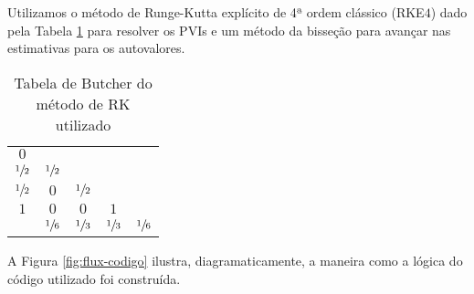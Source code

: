 \documentclass[twocolumn,showpacs,%
  nofootinbib,aps,superscriptaddress,%
  eqsecnum,prd,notitlepage,showkeys,10pt]{revtex4-1}
\begin{document}
Utilizamos o método de Runge-Kutta explícito de 4ª ordem clássico (RKE$4$) dado pela
Tabela \ref{tab:RKE4} para resolver os PVIs e um método da bisseção para
avançar nas estimativas para os autovalores.
%
\begin{table}[H]
    \centering
    \caption{Tabela de Butcher do método de RK utilizado}
    \begin{tabular}{c|cccc}
        $0$ &  &  &  &  \\
        $\sfrac{1}{2}$ & $\sfrac{1}{2}$ &  &  &  \\
        $\sfrac{1}{2}$ & $0$ & $\sfrac{1}{2}$ &  &  \\
        $1$ & $0$ & $0$ & $1$ &  \\
        \hline
         & $\sfrac{1}{6}$ & $\sfrac{1}{3}$ & $\sfrac{1}{3}$ & $\sfrac{1}{6}$
    \end{tabular}
    \label{tab:RKE4}
\end{table}
%
A Figura \ref{fig:flux-codigo} ilustra, diagramaticamente, a maneira como
a lógica do código utilizado foi construída.
%
\end{document}
